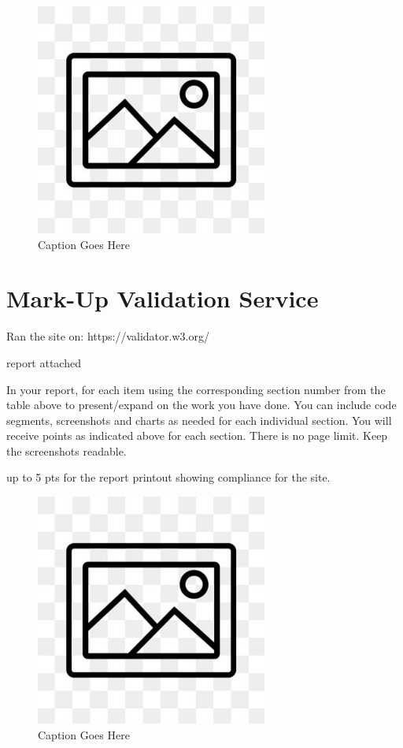 \documentclass[12pt, letterpaper]{article}
\begin{document}
\begin{figure}[htbp]
	\centering
	\includegraphics[width=3in]{images/placeholder.jpg}
	\caption{Caption Goes Here}
 \end{figure}

 \newpage

\section{Mark-Up Validation Service}

Ran the site on: https://validator.w3.org/

report attached

In your report, for each item using the corresponding section number from the table above to present/expand on the work you have done. You can include code segments, screenshots and charts as needed for each individual section. You will receive points as indicated above for each section. There is no page limit. Keep the screenshots readable.

up to 5 pts for the report printout showing compliance for the site.

\begin{figure}[htbp]
	\centering
	\includegraphics[width=3in]{images/placeholder.jpg}
	\caption{Caption Goes Here}
 \end{figure}
\end{document}
